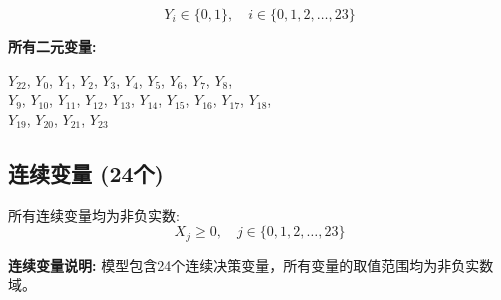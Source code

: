 \documentclass[a4paper,10pt]{article}
\begin{document}
\begin{equation}
Y_i \in \{0,1\}, \quad i \in \{0, 1, 2, \ldots, 23\}
\end{equation}

\textbf{所有二元变量:}

{\small
$Y_{22}$, $Y_{0}$, $Y_{1}$, $Y_{2}$, $Y_{3}$, $Y_{4}$, $Y_{5}$, $Y_{6}$, $Y_{7}$, $Y_{8}$, \\
$Y_{9}$, $Y_{10}$, $Y_{11}$, $Y_{12}$, $Y_{13}$, $Y_{14}$, $Y_{15}$, $Y_{16}$, $Y_{17}$, $Y_{18}$, \\
$Y_{19}$, $Y_{20}$, $Y_{21}$, $Y_{23}$
}

\subsection{连续变量 (24个)}

所有连续变量均为非负实数:
\begin{equation}
X_j \geq 0, \quad j \in \{0, 1, 2, \ldots, 23\}
\end{equation}

\textbf{连续变量说明:} 模型包含24个连续决策变量，所有变量的取值范围均为非负实数域。
\end{document}
